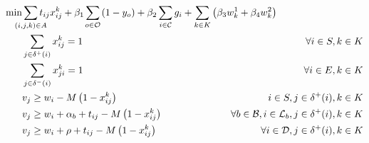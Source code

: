 \documentclass{article}
\begin{document}
\begin{alignat}{3}
    \label{mod:obj}   \min & \smashoperator{ \sum_{ \substack{(i,j,k) \in A} }} {t_{ij}x^{k}_{ij}} + \beta_1\smashoperator{\sum_{ o \in \mathcal{O}}}{  \left(1-y_o\right)} \hspace{-0mm}  + \beta_2 \smashoperator{ \sum_{i \in \mathcal{C} } } { g_i  } +  \sum_{k \in K}\left({\beta_3 w^{1}_k  + \beta_4  w^{2}_k}\right) &                                                                                                  \\
    \label{mod:c1}         & \sum_{j \in \delta^{+}(i) }{x^k_{ij}} =1                                                                                                                                                                                                                                                         & \forall i \in S, k \in K                                                                         \\
    \label{mod:c2}         & \sum_{j \in \delta^{-}(i)}{x^k_{ji}} = 1                                                                                                                                                                                                                                                         & \forall i \in E, k \in K                                                                         \\
    \label{mod:c03}        & v_j \geq  w_i  - M\left(1-x^{k}_{ij}\right)                                                                                                                                                                                                                                                      & \hspace{-20mm}  i \in S, j \in \delta^{+}(i),  k \in K                                           \\
    \label{mod:c3}         & v_j \geq  w_i + \alpha_{b} + t_{ij} - M\left(1-x^{k}_{ij}\right)                                                                                                                                                                                                                                 & \hspace{-20mm} \forall b \in \mathcal{B}, i \in \mathcal{L}_b, j \in \delta^{+}(i),  k \in K     \\
    \label{mod:c4}         & v_j \geq  w_i + \rho + t_{ij} - M\left(1-x^{k}_{ij}\right)                                                                                                                                                                                                                                       & \hspace{-20mm} \forall i \in \mathcal{D}  , j \in \delta^{+}(i), k \in K                         \\

\end{alignat}
\end{document}
